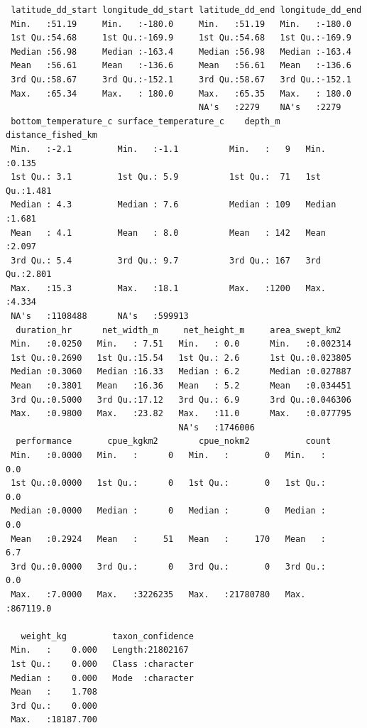 \documentclass[
  letterpaper,
  oneside,
  open=any]{scrbook}
\begin{document}
\begin{verbatim}
 latitude_dd_start longitude_dd_start latitude_dd_end longitude_dd_end
 Min.   :51.19     Min.   :-180.0     Min.   :51.19   Min.   :-180.0  
 1st Qu.:54.68     1st Qu.:-169.9     1st Qu.:54.68   1st Qu.:-169.9  
 Median :56.98     Median :-163.4     Median :56.98   Median :-163.4  
 Mean   :56.61     Mean   :-136.6     Mean   :56.61   Mean   :-136.6  
 3rd Qu.:58.67     3rd Qu.:-152.1     3rd Qu.:58.67   3rd Qu.:-152.1  
 Max.   :65.34     Max.   : 180.0     Max.   :65.35   Max.   : 180.0  
                                      NA's   :2279    NA's   :2279    
 bottom_temperature_c surface_temperature_c    depth_m     distance_fished_km
 Min.   :-2.1         Min.   :-1.1          Min.   :   9   Min.   :0.135     
 1st Qu.: 3.1         1st Qu.: 5.9          1st Qu.:  71   1st Qu.:1.481     
 Median : 4.3         Median : 7.6          Median : 109   Median :1.681     
 Mean   : 4.1         Mean   : 8.0          Mean   : 142   Mean   :2.097     
 3rd Qu.: 5.4         3rd Qu.: 9.7          3rd Qu.: 167   3rd Qu.:2.801     
 Max.   :15.3         Max.   :18.1          Max.   :1200   Max.   :4.334     
 NA's   :1108488      NA's   :599913                                         
  duration_hr      net_width_m     net_height_m     area_swept_km2    
 Min.   :0.0250   Min.   : 7.51   Min.   : 0.0      Min.   :0.002314  
 1st Qu.:0.2690   1st Qu.:15.54   1st Qu.: 2.6      1st Qu.:0.023805  
 Median :0.3060   Median :16.33   Median : 6.2      Median :0.027887  
 Mean   :0.3801   Mean   :16.36   Mean   : 5.2      Mean   :0.034451  
 3rd Qu.:0.5000   3rd Qu.:17.12   3rd Qu.: 6.9      3rd Qu.:0.046306  
 Max.   :0.9800   Max.   :23.82   Max.   :11.0      Max.   :0.077795  
                                  NA's   :1746006                     
  performance       cpue_kgkm2        cpue_nokm2           count         
 Min.   :0.0000   Min.   :      0   Min.   :       0   Min.   :     0.0  
 1st Qu.:0.0000   1st Qu.:      0   1st Qu.:       0   1st Qu.:     0.0  
 Median :0.0000   Median :      0   Median :       0   Median :     0.0  
 Mean   :0.2924   Mean   :     51   Mean   :     170   Mean   :     6.7  
 3rd Qu.:0.0000   3rd Qu.:      0   3rd Qu.:       0   3rd Qu.:     0.0  
 Max.   :7.0000   Max.   :3226235   Max.   :21780780   Max.   :867119.0  
                                                                         
   weight_kg         taxon_confidence  
 Min.   :    0.000   Length:21802167   
 1st Qu.:    0.000   Class :character  
 Median :    0.000   Mode  :character  
 Mean   :    1.708                     
 3rd Qu.:    0.000                     
 Max.   :18187.700                     
                                       
\end{verbatim}
\end{document}
